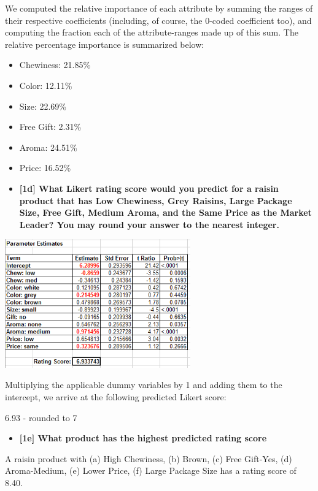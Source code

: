 \documentclass[10pt, oneside,spanish]{article}
\begin{document}
We computed the relative importance of each attribute by summing the ranges of their respective coefficients (including, of course, the 0-coded coefficient too), and computing the fraction each of the attribute-ranges made up of this sum. The relative percentage importance is summarized below:

\begin{itemize}
\item Chewiness: 21.85\%
\item Color: 12.11\%
\item Size: 22.69\%
\item Free Gift: 2.31\%
\item Aroma: 24.51\%
\item Price: 16.52\%
\end{itemize}



\begin{itemize}
\item \textbf{[1d] What Likert  rating score would you predict for a raisin product that has Low Chewiness, Grey Raisins, Large Package Size, Free Gift, Medium Aroma, and the Same Price as the Market Leader?  You may round your answer to the nearest integer. }
\end{itemize}

\begin{center}
\includegraphics[width=8cm]{1d.PNG}
\end{center}

Multiplying the applicable dummy variables by 1 and adding them to the intercept, we arrive at the following predicted Likert score:

6.93  - rounded to 7

\begin{itemize}
\item \textbf{[1e] What product has the highest predicted rating score}
\end{itemize}

A raisin product with (a) High Chewiness, (b) Brown, (c) Free Gift-Yes, (d) Aroma-Medium, (e) Lower Price, (f) Large Package Size has a rating score of 8.40.
\end{document}
